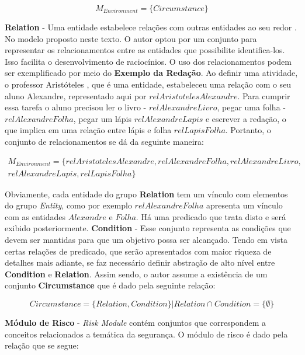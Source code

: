 \begin{equation}
    M_{Environment} = \{  Circumstance  \}
\end{equation}

\textbf{Relation} - Uma entidade estabelece relações com outras entidades ao seu redor \cite{entity}. No modelo proposto neste texto. O autor optou por um conjunto para representar os relacionamentos entre as entidades que possibilite identifica-los. Isso facilita o desenvolvimento de raciocínios. O uso 
dos relacionamentos podem ser exemplificado por meio do \textbf{Exemplo da Redação}. Ao definir uma atividade, o professor Aristóteles
, que é uma entidade, estabeleceu uma relação com o seu aluno Alexandre, representado aqui por $relAristotelesAlexandre$. Para cumprir essa tarefa o aluno precisou ler o livro - $relAlexandreLivro$, pegar uma folha - $relAlexandreFolha$,  pegar um lápis $relAlexandreLapis$ e escrever a redação, o que implica em uma relação entre lápis e folha $relLapisFolha$. Portanto, o conjunto de relacionamentos se dá da seguinte maneira:

\begin{eqnarray}\label{Environment}\nonumber
    M_{Environment} = \{ relAristotelesAlexandre, relAlexandreFolha, relAlexandreLivro, \\ \nonumber
     relAlexandreLapis, relLapisFolha \}
\end{eqnarray}

Obviamente, cada entidade do grupo \textbf{Relation} tem um vínculo com elementos do grupo \textit{Entity}, como por exemplo $relAlexandreFolha$ apresenta um vínculo com as entidades $Alexandre$ e $Folha$. Há uma predicado que trata disto e será exibido posteriormente. \textbf{Condition} - Esse conjunto representa as condições que devem ser mantidas para que um objetivo possa ser alcançado. Tendo em vista certas relações de predicado, que serão apresentados com maior riqueza de detalhes mais adiante, se faz necessário definir abstração de alto nível entre \textbf{Condition} e \textbf{Relation}. Assim sendo, o autor assume a existência de um conjunto \textbf{Circumstance} que é dado pela seguinte relação: 

\begin{equation}
    Circumstance = \{ Relation, Condition \} |  Relation \cap Condition = \{ \emptyset \}
\end{equation}


\textbf{Módulo de Risco} - \textit{Risk Module} contém conjuntos que correspondem a conceitos relacionados a temática da segurança.
O módulo de risco é dado pela relação que se segue:

